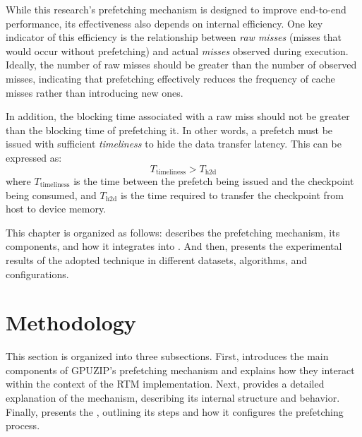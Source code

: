 \documentclass[Ingles]{ic-tese-v3}
\begin{document}

While this research's prefetching mechanism is designed to improve end-to-end performance, its effectiveness also depends on internal efficiency. One key indicator of this efficiency is the relationship between \textit{raw misses} (misses that would occur without prefetching) and actual \textit{misses} observed during execution. Ideally, the number of raw misses should be greater than the number of observed misses, indicating that prefetching effectively reduces the frequency of cache misses rather than introducing new ones.

In addition, the blocking time associated with a raw miss should not be greater than the blocking time of prefetching it. In other words, a prefetch must be issued with sufficient \textit{timeliness} to hide the data transfer latency. This can be expressed as:
\[
T_{\text{timeliness}} > T_{\text{h2d}}
\]
where $T_{\text{timeliness}}$ is the time between the prefetch being issued and the checkpoint being consumed, and $T_{\text{h2d}}$ is the time required to transfer the checkpoint from host to device memory.

This chapter is organized as follows:  describes the prefetching mechanism, its components, and how it integrates into \awave. And then,  presents the experimental results of the adopted technique in different datasets, \checkpointing algorithms, and configurations.


\section{Methodology}
\label{sec:prefetch_methodology}

This section is organized into three subsections. First,  introduces the main components of GPUZIP’s prefetching mechanism and explains how they interact within the context of the \awave RTM implementation. Next,  provides a detailed explanation of the \cache mechanism, describing its internal structure and behavior. Finally,  presents the \psa, outlining its steps and how it configures the prefetching process.
\end{document}
